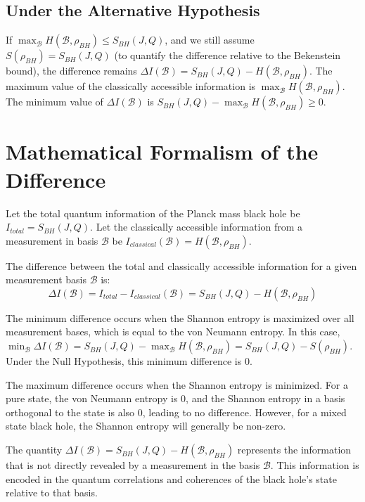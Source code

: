 	\subsection{Under the Alternative Hypothesis}
	If $\max_{\mathcal{B}} H(\mathcal{B}, \rho_{BH}) \le S_{BH}(J, Q)$, and we still assume $S(\rho_{BH}) = S_{BH}(J, Q)$ (to quantify the difference relative to the Bekenstein bound), the difference remains $\Delta I(\mathcal{B}) = S_{BH}(J, Q) - H(\mathcal{B}, \rho_{BH})$. The maximum value of the classically accessible information is $\max_{\mathcal{B}} H(\mathcal{B}, \rho_{BH})$. The minimum value of $\Delta I(\mathcal{B})$ is $S_{BH}(J, Q) - \max_{\mathcal{B}} H(\mathcal{B}, \rho_{BH}) \ge 0$.
	
	\section{Mathematical Formalism of the Difference}
	
	Let the total quantum information of the Planck mass black hole be $I_{total} = S_{BH}(J, Q)$.
	Let the classically accessible information from a measurement in basis $\mathcal{B}$ be $I_{classical}(\mathcal{B}) = H(\mathcal{B}, \rho_{BH})$.
	
	The difference between the total and classically accessible information for a given measurement basis $\mathcal{B}$ is:
	$$\Delta I(\mathcal{B}) = I_{total} - I_{classical}(\mathcal{B}) = S_{BH}(J, Q) - H(\mathcal{B}, \rho_{BH})$$
	
	The minimum difference occurs when the Shannon entropy is maximized over all measurement bases, which is equal to the von Neumann entropy. In this case, $\min_{\mathcal{B}} \Delta I(\mathcal{B}) = S_{BH}(J, Q) - \max_{\mathcal{B}} H(\mathcal{B}, \rho_{BH}) = S_{BH}(J, Q) - S(\rho_{BH})$. Under the Null Hypothesis, this minimum difference is 0.
	
	The maximum difference occurs when the Shannon entropy is minimized. For a pure state, the von Neumann entropy is 0, and the Shannon entropy in a basis orthogonal to the state is also 0, leading to no difference. However, for a mixed state black hole, the Shannon entropy will generally be non-zero.
	
	The quantity $\Delta I(\mathcal{B}) = S_{BH}(J, Q) - H(\mathcal{B}, \rho_{BH})$ represents the information that is not directly revealed by a measurement in the basis $\mathcal{B}$. This information is encoded in the quantum correlations and coherences of the black hole's state relative to that basis.
	
